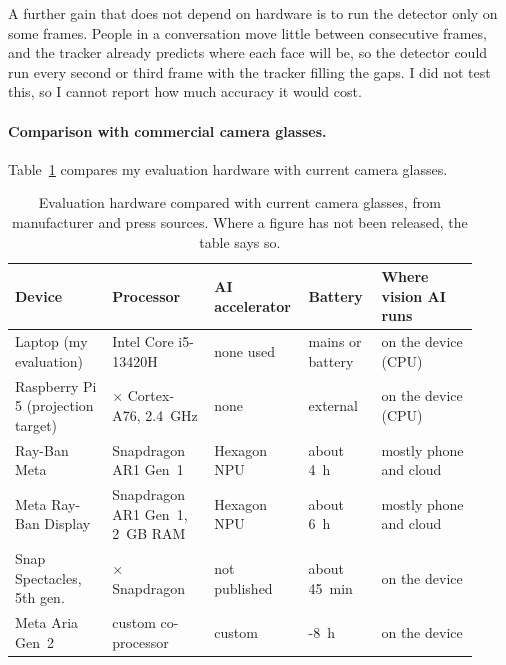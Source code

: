 A further gain that does not depend on hardware is to run the detector only on some
frames. People in a conversation move little between consecutive frames, and the tracker
already predicts where each face will be, so the detector could run every second or third
frame with the tracker filling the gaps. I did not test this, so I cannot report how much
accuracy it would cost.

\paragraph{Comparison with commercial camera glasses.}
Table~\ref{tab:glasses} compares my evaluation hardware with current camera glasses.

\begin{table}[htbp]
\begin{singlespace}
\centering
\caption{Evaluation hardware compared with current camera glasses, from manufacturer and
press sources. Where a figure has not been released, the table says so.}
\label{tab:glasses}
\renewcommand{\arraystretch}{1.3}
\small
\setlength{\tabcolsep}{4pt}
\begin{tabular}{@{}>{\raggedright\arraybackslash}p{0.20\linewidth}
                 >{\raggedright\arraybackslash}p{0.21\linewidth}
                 >{\raggedright\arraybackslash}p{0.16\linewidth}
                 >{\raggedright\arraybackslash}p{0.15\linewidth}
                 >{\raggedright\arraybackslash}p{0.20\linewidth}@{}}
\toprule
\textbf{Device} & \textbf{Processor} & \textbf{AI accelerator} & \textbf{Battery} &
\textbf{Where vision AI runs} \\
\midrule
Laptop (my evaluation) & Intel Core i5-13420H & none used & mains or battery & on the device (CPU) \\
Raspberry Pi 5 (projection target) & 4$\times$ Cortex-A76, 2.4~GHz & none & external & on the device (CPU) \\
Ray-Ban Meta \cite{qcom_ar1} & Snapdragon AR1 Gen~1 & Hexagon NPU & about 4~h & mostly phone and cloud \\
Meta Ray-Ban Display \cite{gsmarena_display} & Snapdragon AR1 Gen~1, 2~GB RAM & Hexagon NPU & about 6~h & mostly phone and cloud \\
Snap Spectacles, 5th gen.\ \cite{spectacles5} & 2$\times$ Snapdragon & not published & about 45~min & on the device \\
Meta Aria Gen~2 \cite{aria2} & custom co-processor & custom & 6-8~h & on the device \\
\bottomrule
\end{tabular}
\end{singlespace}
\end{table}

